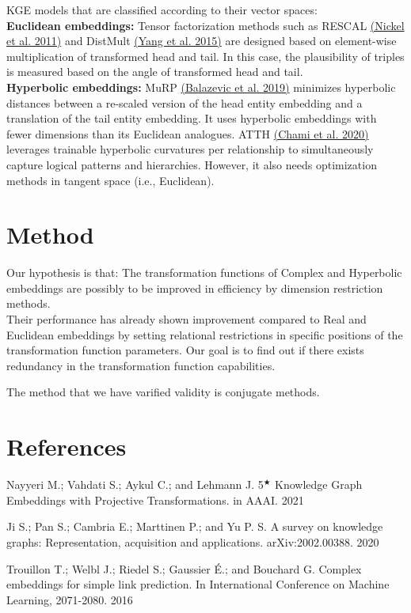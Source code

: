 \documentclass[9pt]{ctexart}
\theoremstyle{definition}
\begin{document}
KGE models that are classified according to their vector spaces:\\
\textbf{Euclidean embeddings:} Tensor factorization methods such as RESCAL 
\hyperlink{Nic11}{(Nickel et al. 2011)} 
and DistMult 
\hyperlink{Yan15}{(Yang et al. 2015)}
are designed based on element-wise multiplication of transformed head and tail. 
In this case, the plausibility of triples is measured based on the angle of transformed head and tail.\\
\textbf{Hyperbolic embeddings:} MuRP 
\hyperlink{Bal19}{(Balazevic et al. 2019)}
minimizes hyperbolic distances between a re-scaled version of the head entity embedding and a translation of the tail entity embedding. 
It uses hyperbolic embeddings with fewer dimensions than its Euclidean analogues.
ATTH 
\hyperlink{Cha20}{(Chami et al. 2020)}
leverages trainable hyperbolic curvatures per relationship to simultaneously capture logical patterns and hierarchies.
However, it also needs optimization methods in tangent space (i.e., Euclidean).

\section{Method}
Our hypothesis is that: The transformation functions of Complex and Hyperbolic embeddings are possibly to be improved in efficiency by dimension restriction methods.\\ 
Their performance has already shown improvement compared to Real and Euclidean embeddings by setting relational restrictions in specific positions of the transformation function parameters.
Our goal is to find out if there exists redundancy in the transformation function capabilities.

The method that we have varified validity is conjugate methods.

\section{References}
\hypertarget{Nay21}{Nayyeri M.; Vahdati S.; Aykul C.; and Lehmann J. 5$^\bigstar$ Knowledge Graph Embeddings with Projective Transformations. in AAAI. 2021}

\hypertarget{JiS20}{Ji S.; Pan S.; Cambria E.; Marttinen P.; and Yu P. S. A survey on knowledge graphs: Representation, acquisition and applications. arXiv:2002.00388. 2020}

\hypertarget{Tro16}{Trouillon T.; Welbl J.; Riedel S.; Gaussier É.; and Bouchard G. Complex embeddings for simple link prediction. In International Conference on Machine Learning, 2071-2080. 2016}
\end{document}
